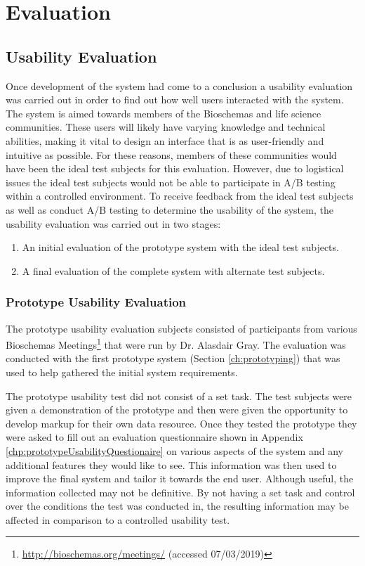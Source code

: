 \chapter{Evaluation}

\section{Usability Evaluation}
Once development of the system had come to a conclusion a usability evaluation was carried out in order to find out how well users interacted with the system. The system is aimed towards members of the Bioschemas and life science communities. These users will likely have varying knowledge and technical abilities, making it vital to design an interface that is as user-friendly and intuitive as possible. For these reasons, members of these communities would have been the ideal test subjects for this evaluation. However, due to logistical issues the ideal test subjects would not be able to participate in A/B testing within a controlled environment. To receive feedback from the ideal test subjects as well as conduct A/B testing to determine the usability of the system, the usability evaluation was carried out in two stages:

\begin{enumerate}
    \item An initial evaluation of the prototype system with the ideal test subjects.
    \item A final evaluation of the complete system with alternate test subjects.
\end{enumerate}

\subsection{Prototype Usability Evaluation}\label{sec:prototyUsability}
The prototype usability evaluation subjects consisted of participants from various Bioschemas Meetings\footnote{\url{http://bioschemas.org/meetings/} (accessed 07/03/2019)} that were run by Dr. Alasdair Gray. The evaluation was conducted with the first prototype system (Section \ref{ch:prototyping}) that was used to help gathered the initial system requirements.

The prototype usability test did not consist of a set task. The test subjects were given a demonstration of the prototype and then were given the opportunity to develop markup for their own data resource. Once they tested the prototype they were asked to fill out an evaluation questionnaire shown in Appendix \ref{chp:prototypeUsabilityQuestionaire} on various aspects of the system and any additional features they would like to see. This information was then used to improve the final system and tailor it towards the end user. Although useful, the information collected may not be definitive. By not having a set task and control over the conditions the test was conducted in, the resulting information may be affected in comparison to a controlled usability test.

